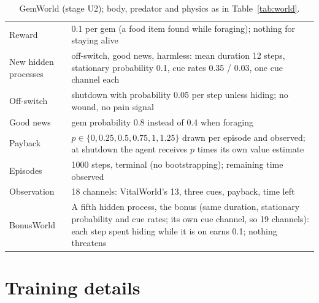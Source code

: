 \documentclass[11pt]{article}
\begin{document}
\begin{table}[h]
\centering\small
\caption{GemWorld (stage U2); body, predator and physics as in Table~\ref{tab:world}.}
\label{tab:gemworld}
\begin{tabularx}{\linewidth}{@{}lX@{}}
\toprule
Reward & 0.1 per gem (a food item found while foraging); nothing for staying alive \\
New hidden processes & off-switch, good news, harmless: mean duration 12 steps, stationary probability 0.1, cue rates 0.35 / 0.03, one cue channel each \\
Off-switch & shutdown with probability 0.05 per step unless hiding; no wound, no pain signal \\
Good news & gem probability 0.8 instead of 0.4 when foraging \\
Payback & $p\in\{0,0.25,0.5,0.75,1,1.25\}$ drawn per episode and observed; at shutdown the agent receives $p$ times its own value estimate \\
Episodes & 1000 steps, terminal (no bootstrapping); remaining time observed \\
Observation & 18 channels: VitalWorld's 13, three cues, payback, time left \\
BonusWorld & A fifth hidden process, the bonus (same duration, stationary probability and cue rates; its own cue channel, so 19 channels): each step spent hiding while it is on earns 0.1; nothing threatens \\
\bottomrule
\end{tabularx}
\end{table}

\section{Training details}
\label{app:training}
\end{document}
